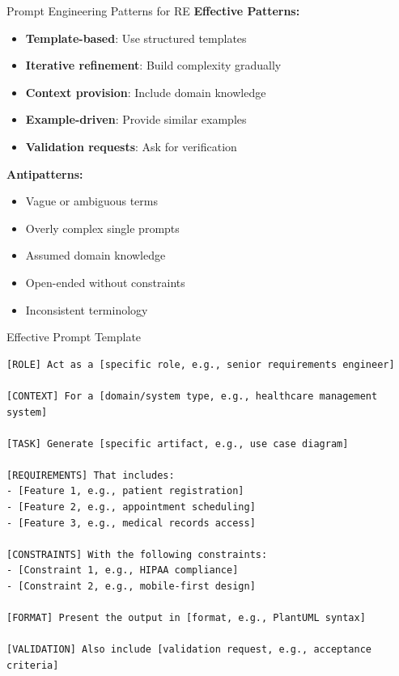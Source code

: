 \documentclass{beamer}
\begin{document}
\begin{frame}{Prompt Engineering Patterns for RE}
            \textbf{Effective Patterns:}
            \begin{itemize}
                \scriptsize
                \item \textbf{Template-based}: Use structured templates
                \item \textbf{Iterative refinement}: Build complexity gradually
                \item \textbf{Context provision}: Include domain knowledge
                \item \textbf{Example-driven}: Provide similar examples
                \item \textbf{Validation requests}: Ask for verification
            \end{itemize}
            \textbf{Antipatterns:}
            \begin{itemize}
                \scriptsize
                \item Vague or ambiguous terms
                \item Overly complex single prompts
                \item Assumed domain knowledge
                \item Open-ended without constraints
                \item Inconsistent terminology
            \end{itemize}
\end{frame}

\begin{frame}[fragile]{Effective Prompt Template}
    \lstset{style=code}
    \begin{lstlisting}[caption={Structured Prompt Template for RE}]
[ROLE] Act as a [specific role, e.g., senior requirements engineer]

[CONTEXT] For a [domain/system type, e.g., healthcare management system]

[TASK] Generate [specific artifact, e.g., use case diagram]

[REQUIREMENTS] That includes:
- [Feature 1, e.g., patient registration]
- [Feature 2, e.g., appointment scheduling]
- [Feature 3, e.g., medical records access]

[CONSTRAINTS] With the following constraints:
- [Constraint 1, e.g., HIPAA compliance]
- [Constraint 2, e.g., mobile-first design]

[FORMAT] Present the output in [format, e.g., PlantUML syntax]

[VALIDATION] Also include [validation request, e.g., acceptance criteria]
    \end{lstlisting}
\end{frame}
\end{document}
